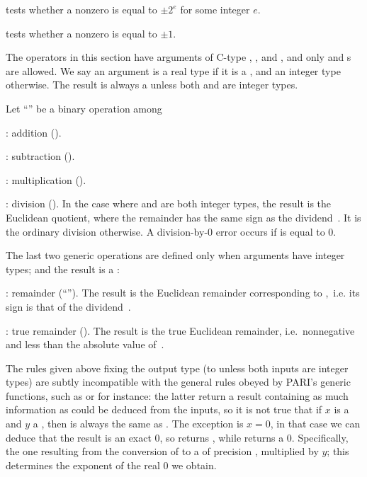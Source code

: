  tests whether a nonzero  
is equal to $\pm 2^e$ for some integer $e$.

 tests whether a nonzero  
is equal to $\pm 1$.

\label{se:genbinop} The operators in this
section have arguments of C-type , , and , and
only  and  s are allowed. We say an argument is a
real type if it is a  , and an integer type otherwise. The
result is always a  unless both  and  are integer
types.

Let ``\op'' be a binary operation among

\item {}: addition ().

\item {}: subtraction ().

\item {}: multiplication ().

\item {}: division (). In the case where  and 
are both integer types, the result is the Euclidean quotient, where the
remainder has the same sign as the dividend~. It is the ordinary
division otherwise. A division-by-$0$ error occurs if  is equal to
$0$.

The last two generic operations are defined only when arguments have integer
types; and the result is a :

\item {}: remainder (``''). The result is the Euclidean
remainder corresponding to ,~i.e. its sign is that of the
dividend~.

\item {}: true remainder (). The result is the true
Euclidean remainder, i.e.~nonnegative and less than the absolute value
of~.

 The rules given above fixing the output
type (to  unless both inputs are integer types) are subtly
incompatible with the general rules obeyed by PARI's generic functions, such
as  or  for instance: the latter return a result
containing as much information as could be deduced from the inputs, so it is
not true that if $x$ is a  and $y$ a , then
 is always the same as . The exception
is $x = 0$, in that case we can deduce that the result is an exact $0$,
so  returns , while  returns a
 $0$. Specifically, the one resulting from the conversion of
 to a  of precision , multiplied by
$y$; this determines the exponent of the real $0$ we obtain.

